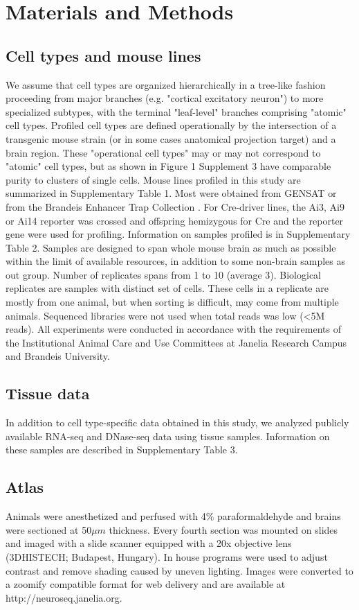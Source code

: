 \section{Materials and Methods}

\subsection{Cell types and mouse lines}
We assume that cell types are organized hierarchically in a tree-like fashion proceeding from major branches (e.g. "cortical excitatory neuron") to more specialized subtypes, with the terminal "leaf-level" branches comprising "atomic" cell types. Profiled cell types are defined operationally by the intersection of a transgenic mouse strain (or in some cases anatomical projection target) and a brain region. These "operational cell types" may or may not correspond to "atomic" cell types, but as shown in Figure 1 Supplement 3 have comparable purity to clusters of single cells. Mouse lines profiled in this study are summarized in Supplementary Table 1. Most were obtained from GENSAT \citep{Gong_2007} or from the Brandeis Enhancer Trap Collection \citep{Shima_2016}. For Cre-driver lines, the Ai3, Ai9 or Ai14 reporter \citep{Madisen_2009} was crossed and offspring hemizygous for Cre and the reporter gene were used for profiling. Information on samples profiled is in Supplementary Table 2. Samples are designed to span whole mouse brain as much as possible within the limit of available resources, in addition to some non-brain samples as out group. Number of replicates spans from 1 to 10 (average 3). Biological replicates are samples with distinct set of cells. These cells in a replicate are mostly from one animal, but when sorting is difficult, may come from multiple animals. Sequenced libraries were not used when total reads was low (<5M reads). All experiments were conducted in accordance with the requirements of the Institutional Animal Care and Use Committees at Janelia Research Campus and Brandeis University.

\subsection{Tissue data}
In addition to cell type-specific data obtained in this study, we analyzed publicly available RNA-seq and DNase-seq data using tissue samples. Information on these samples are described in Supplementary Table 3.

\subsection{Atlas}
Animals were anesthetized and perfused with 4\% paraformaldehyde and brains were sectioned at 50$\mu m$ thickness. Every fourth section was mounted on slides and imaged with a slide scanner equipped with a 20x objective lens (3DHISTECH; Budapest, Hungary). In house programs were used to adjust contrast and remove shading caused by uneven lighting. Images were converted to a zoomify compatible format for web delivery and are available at http://neuroseq.janelia.org.

